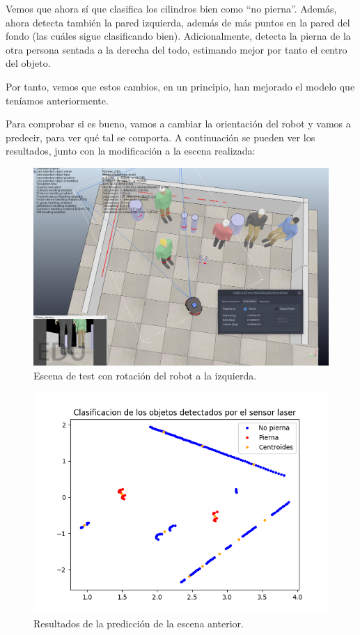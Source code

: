 \documentclass[11pt,a4paper]{article}
\begin{document}
Vemos que ahora sí que clasifica los cilindros bien como ``no pierna''. Además, ahora
detecta también la pared izquierda, además de más puntos en la pared del fondo (las cuáles
sigue clasificando bien). Adicionalmente, detecta la pierna de la otra persona sentada a
la derecha del todo, estimando mejor por tanto el centro del objeto.

Por tanto, vemos que estos cambios, en un principio, han mejorado el modelo que teníamos
anteriormente.

Para comprobar si es bueno, vamos a cambiar la orientación del robot y vamos a predecir,
para ver qué tal se comporta. A continuación se pueden ver los resultados, junto con
la modificación a la escena realizada:

\begin{figure}[H]
\centering
\includegraphics[scale=0.3]{img/simulador2}
\caption{Escena de test con rotación del robot a la izquierda.}
\end{figure}

\begin{figure}[H]
\centering
\includegraphics[scale=0.6]{img/pred2}
\caption{Resultados de la predicción de la escena anterior.}
\label{fig:pred2}
\end{figure}
\end{document}
